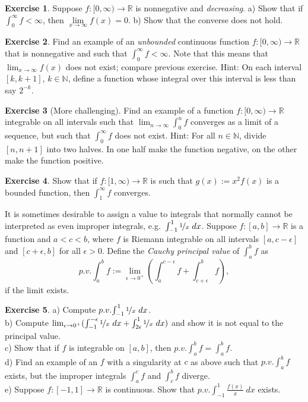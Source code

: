 \documentclass[12pt]{book}
\newcommand{\R}{{\mathbb{R}}}
\newcommand{\N}{{\mathbb{N}}}
\newcommand{\myindex}[1]{#1\index{#1}}
\theoremstyle{plain}
\theoremstyle{remark}
\theoremstyle{definition}
\newenvironment{exnote}{\small}{}
\theoremstyle{exercise}
\newtheorem{exercise}{Exercise}[section]
\theoremstyle{example}
\begin{document}
\begin{exercise}
Suppose $f \colon [0,\infty) \to \R$ is nonnegative and
\emph{decreasing}.
a) Show that if $\int_0^\infty f < \infty$, then $\lim\limits_{x\to\infty} f(x) = 0$.
b) Show that the converse does not hold.
\end{exercise}

\begin{exercise}
Find an example of an \emph{unbounded} continuous function $f \colon
[0,\infty) \to \R$ that is nonnegative and such that $\int_0^\infty f < \infty$.
Note that this means that $\lim_{x\to\infty} f(x)$ does not exist; compare
previous exercise.
Hint: On each interval $[k,k+1]$, $k \in \N$, define a function whose
integral over this interval is less than say $2^{-k}$.
\end{exercise}

\begin{exercise}[More challenging]
Find an example of a function $f \colon [0,\infty) \to \R$ integrable on all
intervals such that $\lim_{n\to\infty} \int_0^n f$ converges as a
limit of a sequence, but such that
$\int_0^\infty f$ does not exist.
Hint: For all $n\in \N$, divide $[n,n+1]$ into two halves.  In one half
make the function negative, on the other make the function positive.
\end{exercise}

\begin{exercise}
Show that if $f \colon [1,\infty) \to \R$ is such that
$g(x) := x^2 f(x)$ is a bounded function, then
$\int_1^\infty f$ converges.
\end{exercise}

\begin{exnote}
It is sometimes desirable to assign a value to integrals that normally
cannot be interpreted as even improper integrals,
e.g.\ $\int_{-1}^1 \nicefrac{1}{x}~dx$.
Suppose $f \colon [a,b] \to \R$ is a function and $a < c < b$,
where $f$ is Riemann integrable on all intervals
$[a,c-\epsilon]$ and $[c+\epsilon,b]$ for all $\epsilon > 0$.
Define
the \emph{\myindex{Cauchy principal value}} of $\int_a^b f$ as
\begin{equation*}
p.v.\!\int_a^b f := \lim_{\epsilon\to 0^+}
\left(
\int_a^{c-\epsilon} f + 
\int_{c+\epsilon}^b f
\right) ,
\end{equation*}
if the limit exists.
\end{exnote}

\begin{exercise}
a) Compute $p.v.\!\int_{-1}^1 \nicefrac{1}{x}~dx$.
\\
b) Compute
$\lim_{\epsilon\to 0^+}
( \int_{-1}^{-\epsilon} \nicefrac{1}{x}~dx + 
\int_{2\epsilon}^1 \nicefrac{1}{x}~dx )$ and show it is not equal
to the principal value.
\\
c) Show that if $f$ is integrable on $[a,b]$, then
$p.v.\!\int_a^b f = \int_a^b f$.
\\
d) Find an example of an $f$ with a singularity at $c$ as above
such that 
$p.v.\!\int_a^b f$ exists, but the improper integrals
$\int_a^c f$ and $\int_c^b f$ diverge.
\\
e) Suppose 
$f \colon [-1,1] \to \R$ is continuous.  Show that
$p.v.\!\int_{-1}^1 \frac{f(x)}{x}~dx$ exists.
\end{exercise}
\end{document}
